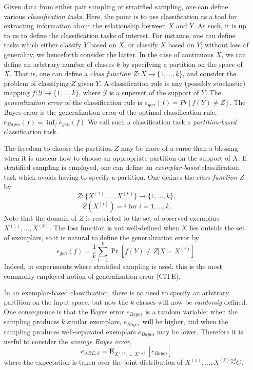 \documentclass{article}
\newcommand{\E}{\textbf{E}}
\begin{document}
Given data from either pair sampling or stratified sampling, one can define various
\emph{classification tasks}.  Here, the point is to use classification as a tool for extracting information
about the relationship between $X$ and $Y$.  As such, it is up to us to define the classification tasks
of interest.  For instance, one can define tasks which either classify $Y$ based on $X$, or classify $X$ based on $Y$; without loss of generality, we henceforth consider the latter.  In the case of continuous $X$, we can define an arbitrary number of classes $k$ by specifying a partition on the space of $X$.
That is, one can define a \emph{class function} $Z: X \to \{1,\hdots, k\}$, and consider the problem of classifying $Z$ given $Y$.  A classification rule is
any (possibly stochastic) mapping $f: \mathcal{Y} \to \{1,\hdots,
k\}$, where $\mathcal{Y}$ is a superset of the support of $Y$.  The \emph{generalization error} of the classification rule is
$
e_{gen}(f) = Pr[f(Y) \neq Z].
$
The Bayes error is the generalization error of the optimal classification rule,
$
e_{Bayes}(f) = \inf_f e_{gen}(f)
$
We call such a classification task a \emph{partition-based} classification task.

The freedom to choose the partition $Z$ may be more of a curse than a blessing when it is unclear how
to choose an appropriate partition on the support of $X$.  If stratified sampling is employed,
one can define an \emph{exemplar-based} classification task which avoids having to specify a partition.  One defines the \emph{class function} $Z$ by
\[
Z: \{X^{(1)}, \hdots, X^{(k)}\} \to \{1,\hdots, k\},
\]
\[
Z(X^{(i)}) = i\text{ for }i = 1, \hdots, k.
\]
Note that the domain of $Z$ is restricted to the set of observed exemplars $X^{(1)},\hdots, X^{(k)}$.
The loss function is not well-defined when $X$ lies outside the set of exemplars,
so it is natural to define the generalization error by
\[
e_{gen}(f) = \frac{1}{k} \sum_{i=1}^k\Pr[f(Y) \neq Z|X = X^{(i)}].
\]
Indeed, in experiments where stratified sampling is used, this is the most commonly employed notion
of generalization error (CITE).

In an exemplar-based classification, there is no need to specify an arbitrary partition on the input space, but now the $k$ classes will now be \emph{randomly} defined.  One consequence is that the Bayes error $e_{Bayes}$ is a random variable: when the sampling produces $k$ similar exemplars, $e_{Bayes}$ will be higher, and when the sampling produces well-separated exemplars $e_{Bayes}$ may be lower.  
Therefore it is useful to consider the \emph{average Bayes error},
\[
e_{ABE, k} = \E_{X^{(1)},\hdots, X^{(k)}}[e_{Bayes}]
\]
where the expectation is taken over the joint distribution of $X^{(1)},\hdots, X^{(k)} \stackrel{iid}{\sim} G$.
\end{document}
